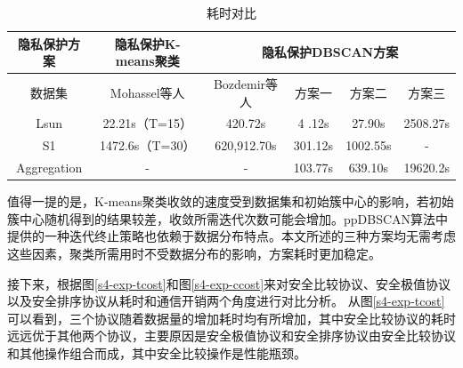 \begin{table}[!htbp]
	\centering
	\renewcommand{\arraystretch}{1.3}
	\caption{耗时对比}
	\label{s4-table-runtime}
	\begin{tabular}{c|c|c|c|c|c}
		\hline
		隐私保护方案 & 隐私保护K-means聚类                      & \multicolumn{4}{c}{隐私保护DBSCAN方案}                                 \\
		\hline
		数据集       & Mohassel等人\cite{mohassel2019practical} & Bozdemir等人\cite{bozdemir2021privacy} & 方案一  & 方案二   & 方案三   \\
		\hline
		Lsun         & 22.21s（T=15）                           & 420.72s                                & 4 .12s  & 27.90s   & 2508.27s \\
		\hline
		S1           & 1472.6s（T=30）                          & 620,912.70s                            & 301.12s & 1002.55s & -        \\
		\hline
		Aggregation  & -                                        & -                                      & 103.77s & 639.10s  & 19620.2s \\
		\hline
	\end{tabular}
\end{table}

值得一提的是，K-means聚类收敛的速度受到数据集和初始簇中心的影响，若初始簇中心随机得到的结果较差，收敛所需迭代次数可能会增加。ppDBSCAN算法中提供的一种迭代终止策略也依赖于数据分布特点。本文所述的三种方案均无需考虑这些因素，聚类所需用时不受数据分布的影响，方案耗时更加稳定。

接下来，根据图\ref{s4-exp-tcost}和图\ref{s4-exp-ccost}来对安全比较协议、安全极值协议以及安全排序协议从耗时和通信开销两个角度进行对比分析。
从图\ref{s4-exp-tcost}可以看到，三个协议随着数据量的增加耗时均有所增加，其中安全比较协议的耗时远远优于其他两个协议，主要原因是安全极值协议和安全排序协议由安全比较协议和其他操作组合而成，其中安全比较操作是性能瓶颈。


